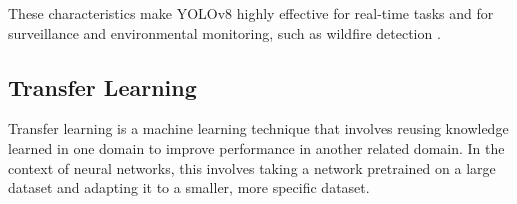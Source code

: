 These characteristics make YOLOv8 highly effective for real-time tasks and for surveillance
and environmental monitoring, such as wildfire detection \cite{s23208374}.

\subsection{Transfer Learning}
\label{subsec:transfer-learning}

Transfer learning is a machine learning technique that involves reusing knowledge learned
in one domain to improve performance in another related domain.
In the context of neural networks, this involves taking a network pretrained on a large dataset and adapting it
to a smaller, more specific dataset.
